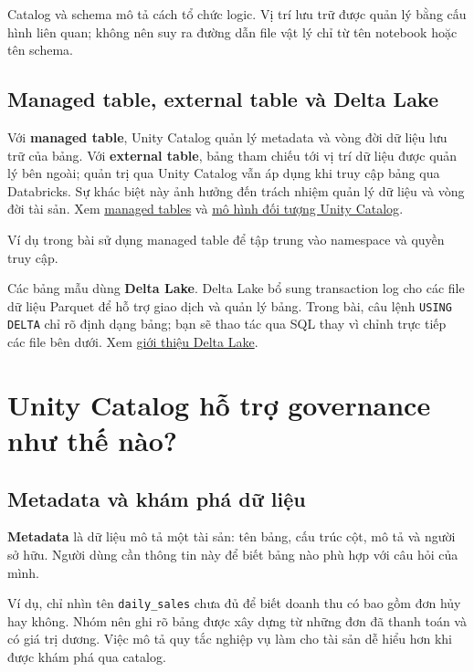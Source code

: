 Catalog và schema mô tả cách tổ chức logic. Vị trí lưu trữ được quản lý bằng cấu hình liên quan; không nên suy ra đường dẫn file vật lý chỉ từ tên notebook hoặc tên schema.


\FloatBarrier
{}
\subsection{Managed table, external table và Delta Lake}

Với \textbf{managed table}, Unity Catalog quản lý metadata và vòng đời dữ liệu lưu trữ của bảng. Với \textbf{external table}, bảng tham chiếu tới vị trí dữ liệu được quản lý bên ngoài; quản trị qua Unity Catalog vẫn áp dụng khi truy cập bảng qua Databricks. Sự khác biệt này ảnh hưởng đến trách nhiệm quản lý dữ liệu và vòng đời tài sản. Xem \href{https://docs.databricks.com/aws/en/tables/managed}{managed tables} và \href{https://docs.databricks.com/aws/en/data-governance/unity-catalog/}{mô hình đối tượng Unity Catalog}.


Ví dụ trong bài sử dụng managed table để tập trung vào namespace và quyền truy cập.


Các bảng mẫu dùng \textbf{Delta Lake}. Delta Lake bổ sung transaction log cho các file dữ liệu Parquet để hỗ trợ giao dịch và quản lý bảng. Trong bài, câu lệnh \texttt{USING DELTA} chỉ rõ định dạng bảng; bạn sẽ thao tác qua SQL thay vì chỉnh trực tiếp các file bên dưới. Xem \href{https://docs.databricks.com/aws/en/delta/}{giới thiệu Delta Lake}.


\FloatBarrier
{}
\section{Unity Catalog hỗ trợ governance như thế nào?}

\FloatBarrier
{}
\subsection{Metadata và khám phá dữ liệu}

\textbf{Metadata} là dữ liệu mô tả một tài sản: tên bảng, cấu trúc cột, mô tả và người sở hữu. Người dùng cần thông tin này để biết bảng nào phù hợp với câu hỏi của mình.


Ví dụ, chỉ nhìn tên \texttt{daily\_\allowbreak{}sales} chưa đủ để biết doanh thu có bao gồm đơn hủy hay không. Nhóm nên ghi rõ bảng được xây dựng từ những đơn đã thanh toán và có giá trị dương. Việc mô tả quy tắc nghiệp vụ làm cho tài sản dễ hiểu hơn khi được khám phá qua catalog.


